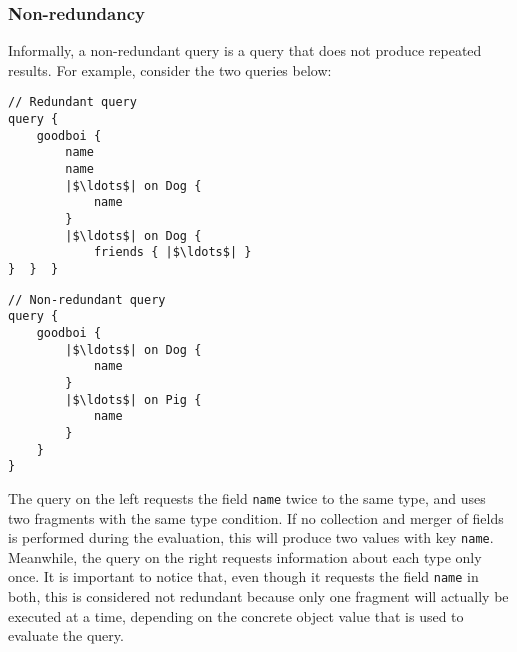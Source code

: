 


\subsubsection*{Non-redundancy}

Informally, 
a non-redundant query is a query that does not produce repeated results.
For example, consider the two queries below:

\begin{minipage}[t]{.25\textwidth}
\begin{verbatim}
// Redundant query
query {
    goodboi {
        name
        name
        |$\ldots$| on Dog {
            name
        }
        |$\ldots$| on Dog {
            friends { |$\ldots$| }
}  }  }
\end{verbatim}
\end{minipage}%
\begin{minipage}[t]{.25\textwidth}
\begin{verbatim}
// Non-redundant query
query {
    goodboi {
        |$\ldots$| on Dog {
            name
        }
        |$\ldots$| on Pig {
            name
        }
    } 
}
\end{verbatim} 
\end{minipage}

The query on the left requests the field \texttt{name} twice to the same type, and uses two fragments with the same type condition. If no collection and merger of fields is performed during the evaluation, this will produce two values with key \texttt{name}. Meanwhile, the query on the right requests information about each type only once. It is important to notice that, even though it requests the field \texttt{name} in both, this is considered not redundant because only one fragment will actually be executed at a time, 
depending on the concrete object value that is used to evaluate the query.

